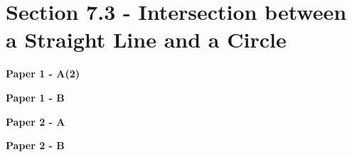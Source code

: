 \documentclass[12pt, a4paper]{article}
\begin{document}
\section*{Section 7.3 - Intersection between a  Straight Line and a Circle \NF}\label{section:5-7-3}

\textbf{Paper 1 - A(2)}
\begin{enumx}[label=\arabic*.,start=17]
\item {}\label{DSE2020-CoreP1-Q14} 
\end{enumx}
\textbf{Paper 1 - B}
\begin{enumx}[label=\arabic*.,start=18]
\item {}\label{DSE2012S-CoreP1-Q19} 
\item {}\label{DSE2016-CoreP1-Q20} 
\item {}\label{DSE2021-CoreP1-Q19} 
\item {}\label{DSE2022-CoreP1-Q19} 
\end{enumx}
\textbf{Paper 2 - A}
\begin{enumx}[label=\arabic*.,start=22]
\item {}\label{DSE2013-CoreP2-Q25} 
\item {}\label{DSE2021-CoreP2-Q27} 
\end{enumx}
\textbf{Paper 2 - B}
\end{document}
